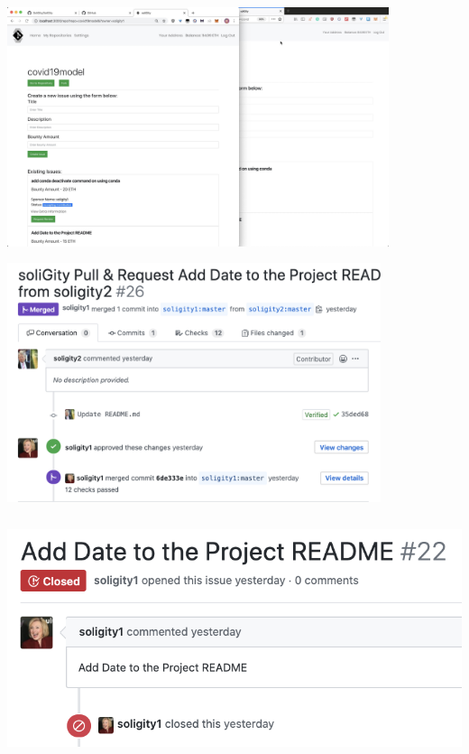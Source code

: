 \documentclass[12pt]{article}
\renewcommand{\_}{\kern-1.5pt\textunderscore\kern-1.5pt}
\begin{document}
\begin{enumerate}
	      \includegraphics[height=7cm]{graphs/43. bob_balance_updated}

	      \includegraphics[height=7cm]{graphs/44. pull_request_closed}

	      \includegraphics[height=7cm]{graphs/45. issue_closed}


	      \newpage

\end{enumerate}\par
\end{document}
